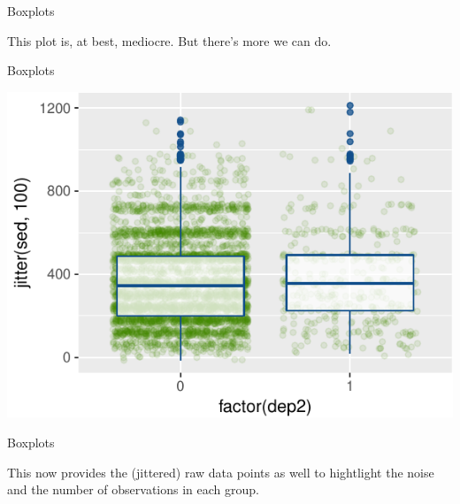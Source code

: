 \begin{frame}[fragile]{Boxplots}

This plot is, at best, mediocre. But there's more we can do.

\begin{Shaded}
\begin{Highlighting}[]
\NormalTok{(}  \NormalTok{))) }\OperatorTok{+}
\StringTok{  }\NormalTok{(}\NormalTok{, } \NormalTok{) }\OperatorTok{+}
\StringTok{  }\NormalTok{(}\NormalTok{, } \NormalTok{) }
\end{Highlighting}
\end{Shaded}

\end{frame}

\begin{frame}{Boxplots}

\includegraphics{09_AdvancedPlotting_files/figure-beamer/c5-1.pdf}

\end{frame}

\begin{frame}{Boxplots}

This now provides the (jittered) raw data points as well to hightlight
the noise and the number of observations in each group.

\end{frame}

